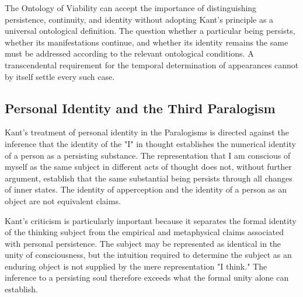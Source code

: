 The Ontology of Viability can accept the
importance of distinguishing persistence,
continuity, and identity without adopting
Kant's principle as a universal ontological
definition. The question whether a particular
being persists, whether its manifestations
continue, and whether its identity remains
the same must be addressed according to
the relevant ontological conditions. A
transcendental requirement for the temporal
determination of appearances cannot by
itself settle every such case.



\subsection{Personal Identity and the Third Paralogism}
\label{subsec:ch08-kant-personal-identity}

\label{para:VS.B01.P01.C08.S10.SS10.P001}

Kant's treatment of personal identity in the
Paralogisms is directed against the inference
that the identity of the "I" in thought
establishes the numerical identity of a
person as a persisting substance. The
representation that I am conscious of
myself as the same subject in different
acts of thought does not, without further
argument, establish that the same substantial
being persists through all changes of
inner states. The identity of apperception
and the identity of a person as an object
are not equivalent claims.
\cite[A361/B408--A363/B411]{KantCritiquePureReason}

\label{para:VS.B01.P01.C08.S10.SS10.P002}

Kant's criticism is particularly important
because it separates the formal identity
of the thinking subject from the empirical
and metaphysical claims associated with
personal persistence. The subject may be
represented as identical in the unity of
consciousness, but the intuition required
to determine the subject as an enduring
object is not supplied by the mere
representation "I think." The inference
to a persisting soul therefore exceeds
what the formal unity alone can establish.

\label{para:VS.B01.P01.C08.S10.SS10.P003}

